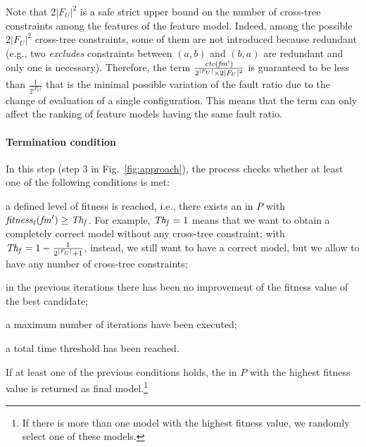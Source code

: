\begin{tikzborder}{\cite{Gargantini16:validation}}
\begin{tikzborder}{\cite{gargantini_combinatorial_2017}}
\begin{tikzborder}{\cite{garn2019}}
\begin{tikzborder}{\cite{arcaini2019achieving}}
	\bb Note that $2 |F_U|^2$ is a safe strict upper bound on the number of cross-tree constraints among the features of the feature model. Indeed, among the possible $2|F_U|^2$ cross-tree constraints, some of them are not introduced because redundant (e.g., two {\it excludes} constraints between $(a,b)$ and $(b,a)$ are redundant and only one is necessary). Therefore, the term $\frac{\mathit{ctc}(\mathit{fm}^\prime)}{2^{|F_U|} \times 2|F_U|^2}$ is guaranteed to be less than $\frac{1}{2^{|F_U|}}$ that is the minimal possible variation of the fault ratio due to the change of evaluation of a single configuration. This means that the term can only affect the ranking of feature models having the same fault ratio.\be
	
	\paragraph{\bf Termination condition}%
	\bb In this step (step 3 in Fig.~\ref{fig:approach}), the process checks whether at least one of the following conditions is met:
	\begin{compactitem}
		\item a defined level of fitness \thF is reached, i.e., there exists an \fmp in $P$ with $\mathit{fitness_t}(\mathit{fm}^\prime) \ge \mathit{Th_f}$. For example, $\mathit{Th_f}=1$ means that we want to obtain a completely correct model without any cross-tree constraint; with $\mathit{Th_f} = 1 - \frac{1}{2^{|F_U|} + 1}$, instead, we still want to have a correct model, but we allow to have any number of cross-tree constraints;
		\item in the previous \thNI iterations there has been no improvement of the fitness value of the best candidate;
		\item a maximum number \thI of iterations have been executed;
		\item a total time threshold \thT has been reached.
	\end{compactitem}
	
	If at least one of the previous conditions holds, the \fmp in $P$ with the highest fitness value is returned as final model.\footnote{If there is more than one model with the highest fitness value, we randomly select one of these models.}\be
	

\end{tikzborder}
\end{tikzborder}
\end{tikzborder}
\end{tikzborder}
